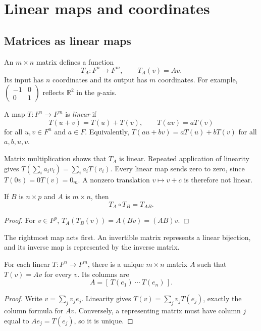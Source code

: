 \chapter{Linear maps and coordinates}\label{chap:algebra-linear-maps}

\section{Matrices as linear maps}

An $m\times n$ matrix defines a function
\[
 T_A:F^n\longrightarrow F^m,\qquad T_A(v)=Av.
\]
Its input has $n$ coordinates and its output has $m$ coordinates.
For example, $\begin{pmatrix}-1&0\\0&1\end{pmatrix}$ reflects
$\mathbb R^2$ in the $y$-axis.

\begin{definition}
A map $T:F^n\to F^m$ is \emph{linear} if
\[
 T(u+v)=T(u)+T(v),\qquad T(av)=aT(v)
\]
for all $u,v\in F^n$ and $a\in F$.
Equivalently, $T(au+bv)=aT(u)+bT(v)$ for all $a,b,u,v$.
\end{definition}

Matrix multiplication shows that $T_A$ is linear. Repeated application of
linearity gives
$T(\sum_i a_iv_i)=\sum_i a_iT(v_i)$.
Every linear map sends zero to zero, since $T(0v)=0T(v)=0_m$.
A nonzero translation $v\mapsto v+c$ is therefore not linear.

\begin{proposition}[Composition]
If $B$ is $n\times p$ and $A$ is $m\times n$, then
\[
 T_A\circ T_B=T_{AB}.
\]
\end{proposition}
\begin{proof}
For $v\in F^p$, $T_A(T_B(v))=A(Bv)=(AB)v$.
\end{proof}

The rightmost map acts first. An invertible matrix represents a linear
bijection, and its inverse map is represented by the inverse matrix.

\begin{theorem}
For each linear $T:F^n\to F^m$, there is a unique $m\times n$ matrix $A$
such that $T(v)=Av$ for every $v$. Its columns are
\[
 \boxed{A=[\,T(e_1)\ \cdots\ T(e_n)\,].}
\]
\end{theorem}
\begin{proof}
Write $v=\sum_j v_je_j$. Linearity gives
$T(v)=\sum_j v_jT(e_j)$, exactly the column formula for $Av$.
Conversely, a representing matrix must have column $j$ equal to
$Ae_j=T(e_j)$, so it is unique.
\end{proof}

